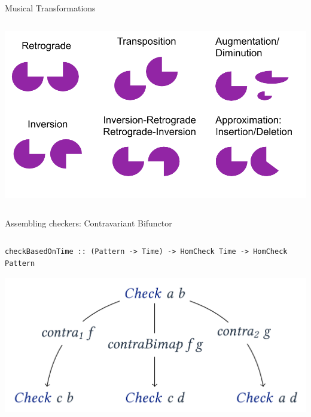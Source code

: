 \documentclass[final]{beamer}
\begin{document}
\begin{frame}[label={sec:orgd59d0ad},fragile]{}
\begin{columns}
\begin{column}[t]{0.47\columnwidth}
\begin{block}{Musical Transformations}
\begin{columns}
\begin{column}[T]{0.85\columnwidth}
\begin{center}
\includegraphics[width=.9\linewidth]{img/transformations.png}
\end{center}
\end{column}
\end{columns}
\end{block}


\begin{block}{Assembling checkers: Contravariant Bifunctor}
\begin{columns}
\begin{column}[T]{0.85\columnwidth}
\begin{verbatim}
checkBasedOnTime :: (Pattern -> Time) -> HomCheck Time -> HomCheck Pattern
\end{verbatim}

\begin{center}
\includegraphics[width=.9\linewidth]{./img/contra.png}
\end{center}
\end{column}
\end{columns}
\end{block}
\end{column}



\end{columns}
\end{frame}
\end{document}
